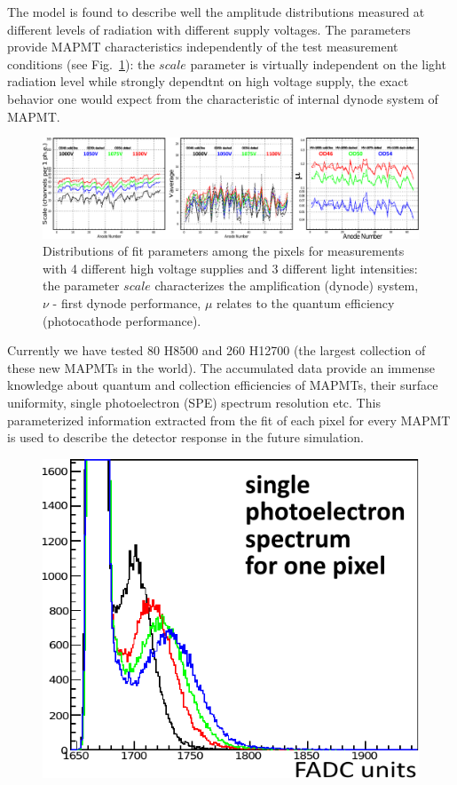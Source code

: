 \documentclass[5p,times,preprint]{elsarticle}
\begin{document}
The model is found to describe well the amplitude distributions measured at different levels of radiation with different supply voltages.
The parameters provide MAPMT characteristics independently of the test measurement conditions (see Fig.~\ref{fig:PavelPassport}): the $scale$ parameter is virtually independent on the light radiation level while strongly dependtnt on high voltage supply, the exact behavior one would expect from the characteristic of internal dynode system of MAPMT.

\begin{figure}[t]
	\centering
	\includegraphics[width=\linewidth]{PavelPassport.pdf}
	\caption{Distributions of fit parameters among the pixels for measurements with 4 different high voltage supplies and 3 different light intensities: the parameter $scale$ characterizes the amplification (dynode) system, $\nu$ - first dynode performance, $\mu$ relates to the quantum efficiency (photocathode performance).}
	\label{fig:PavelPassport}
\end{figure}

Currently we have tested 80 H8500 and 260 H12700 (the largest collection of these new MAPMTs in the world).
The accumulated data provide an immense knowledge about quantum and collection efficiencies of MAPMTs, their surface uniformity, single photoelectron (SPE) spectrum resolution etc.
This parameterized information extracted from the fit of each pixel for every MAPMT is used to describe the detector response in the future simulation.



\begin{figure}[b]
	\centering
	\centering
	\includegraphics[width=0.8\linewidth]{SPEhv.pdf}
	\label{fig:SPEhv}
\end{figure}
\end{document}

